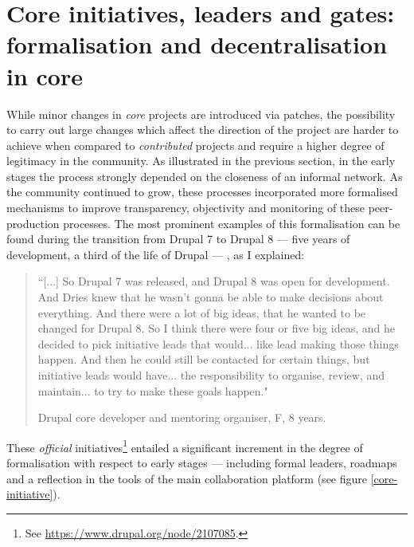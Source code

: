 \section{Core initiatives, leaders and gates: formalisation and decentralisation in core}
\label{subsec:dec-form-core}

While minor changes in \textit{core} projects are introduced via patches, the possibility to carry out large changes which affect the direction of the project are harder to achieve when compared to \textit{contributed} projects  and require a higher degree of legitimacy in the community. As illustrated in the previous section, in the early stages the process strongly depended on the closeness of an informal network. As the community continued to grow, these processes incorporated more formalised mechanisms to improve transparency, objectivity and monitoring of these peer-production processes. The most prominent examples of this formalisation can be found during the transition from Drupal 7 to Drupal 8 --- five years of development, a third of the life of Drupal --- , as I explained:

\begin{quotation}
``[...] So Drupal 7 was released, and Drupal 8 was open for development. And Dries knew that he wasn't gonna be able to make decisions about everything. And there were a lot of big ideas, that he wanted to be changed for Drupal 8. So I think there were four or five big ideas, and he decided to pick initiative leads that would... like lead making those things happen. And then he could still be contacted for certain things, but initiative leads would have... the responsibility to organise, review, and maintain... to try to make these goals happen."
\begin{flushright}\footnotesize{Drupal core developer and mentoring organiser, F, 8 years.}\end{flushright}
\end{quotation}

These \textit{official} initiatives\footnote{See \url{https://www.drupal.org/node/2107085}.} entailed a significant increment in the degree of formalisation with respect to early stages --- including formal leaders, roadmaps and a reflection in the tools of the main collaboration platform (see figure \ref{core-initiative}).

